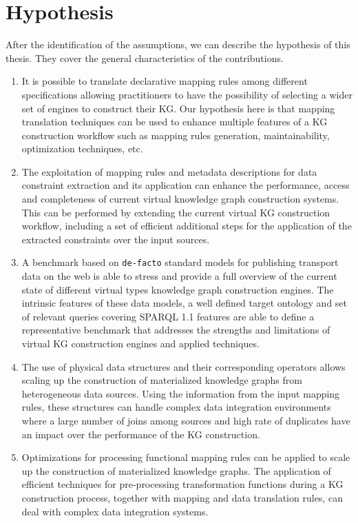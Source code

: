 \section{Hypothesis}
After the identification of the assumptions, we can describe the hypothesis of this thesis. They cover the general characteristics of the contributions.
\begin{enumerate}[label=\textbf{H{\arabic*}}]
    \item It is possible to translate declarative mapping rules among different specifications allowing practitioners to have the possibility of selecting a wider set of engines to construct their KG. Our hypothesis here is that mapping translation techniques can be used to enhance multiple features of a KG construction workflow such as mapping rules generation, maintainability, optimization techniques, etc.
    \item The exploitation of mapping rules and metadata descriptions for data constraint extraction and its application can enhance the performance, access and completeness of current virtual knowledge graph construction systems. This can be performed by extending the current virtual KG construction workflow, including a set of efficient additional steps for the application of the extracted constraints over the input sources. 
    \item A benchmark based on \texttt{de-facto} standard models for publishing transport data on the web is able to stress and provide a full overview of the current state of different virtual types knowledge graph construction engines. The intrinsic features of these data models, a well defined target ontology and set of relevant queries covering SPARQL 1.1 features are able to define a representative benchmark that addresses the strengths and limitations of virtual KG construction engines and applied techniques.
    \item The use of physical data structures and their corresponding operators allows scaling up the construction of materialized knowledge graphs from heterogeneous data sources. Using the information from the input mapping rules, these structures can handle complex data integration environments where a large number of joins among sources and high rate of duplicates have an impact over the performance of the KG construction. 
    \item Optimizations for processing functional mapping rules can be applied to scale up the construction of materialized knowledge graphs. The application of efficient techniques for pre-processing transformation functions during a KG construction process, together with mapping and data translation rules, can deal with complex data integration systems. 
    
\end{enumerate}

